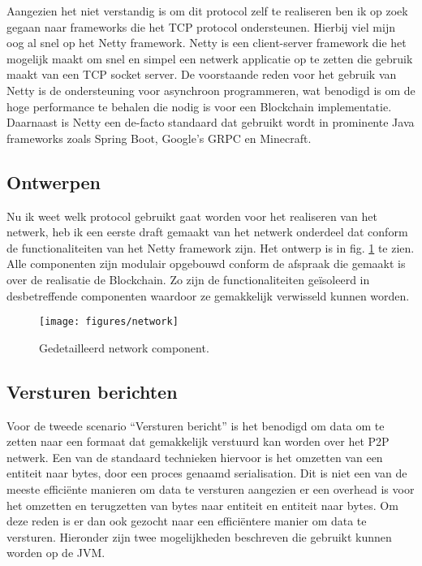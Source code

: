 Aangezien het niet verstandig is om dit protocol zelf te realiseren ben ik op zoek gegaan naar frameworks die het \acrshort{TCP} protocol ondersteunen. Hierbij viel mijn oog al snel op het Netty framework. Netty is een client-server framework die het mogelijk maakt om snel en simpel een netwerk applicatie op te zetten die gebruik maakt van een \acrshort{TCP} socket server. De voorstaande reden voor het gebruik van Netty is de ondersteuning voor asynchroon programmeren, wat benodigd is om de hoge performance te behalen die nodig is voor een Blockchain implementatie. Daarnaast is Netty een de-facto standaard dat gebruikt wordt in prominente Java frameworks zoals Spring Boot, Google's GRPC en Minecraft.

\subsection{Ontwerpen}

Nu ik weet welk protocol gebruikt gaat worden voor het realiseren van het netwerk, heb ik een eerste draft gemaakt van het netwerk onderdeel dat conform de functionaliteiten van het Netty framework zijn. Het ontwerp is in fig. \ref{sprint_1:network} te zien. Alle componenten zijn modulair opgebouwd conform de afspraak die gemaakt is over de realisatie de Blockchain. Zo zijn de functionaliteiten geïsoleerd in desbetreffende componenten waardoor ze gemakkelijk verwisseld kunnen worden.

\clearpage

\begin{figure}[h]
    \texttt{[image: figures/network]}
    \caption[Gedetailleerd overzicht Network component]{Gedetailleerd network component.}
    \label{sprint_1:network}
\end{figure}

\subsection{Versturen berichten}

Voor de tweede scenario ``Versturen bericht'' is het benodigd om data om te zetten naar een formaat dat gemakkelijk verstuurd kan worden over het \acrshort{P2P} netwerk. Een van de standaard technieken hiervoor is het omzetten van een entiteit naar bytes, door een proces genaamd serialisation. Dit is niet een van de meeste efficiënte manieren om data te versturen aangezien er een overhead is voor het omzetten en terugzetten van bytes naar entiteit en entiteit naar bytes. Om deze reden is er dan ook gezocht naar een efficiëntere manier om data te versturen. Hieronder zijn twee mogelijkheden beschreven die gebruikt kunnen worden op de \acrfull{JVM}. 

